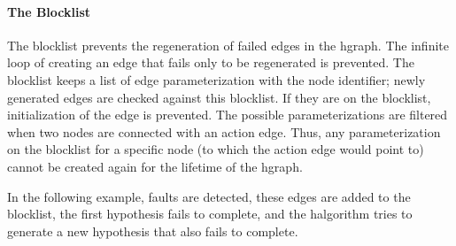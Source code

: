 \paragraph{The Blocklist}%
The blocklist prevents the regeneration of failed edges in the \ac{hgraph}. The infinite loop of creating an edge that fails only to be regenerated is prevented. The blocklist keeps a list of edge parameterization with the node identifier; newly generated edges are checked against this blocklist. If they are on the blocklist, initialization of the edge is prevented. The possible parameterizations are filtered when two nodes are connected with an action edge. Thus, any parameterization on the blocklist for a specific node (to which the action edge would point to) cannot be created again for the lifetime of the \ac{hgraph}.\bs

In the following example,  faults are detected, these edges are added to the blocklist, the first hypothesis fails to complete, and the \ac{halgorithm} tries to generate a new hypothesis that also fails to complete.\bs

